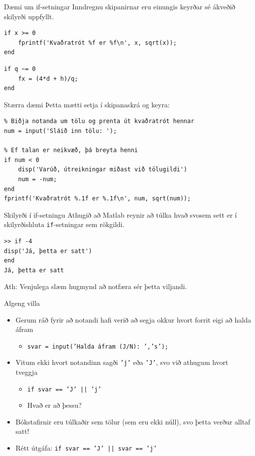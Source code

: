 \documentclass{beamer}
\begin{document}
\begin{frame}[fragile]{Dæmi um if-setningar}
Inndregnu skipanirnar eru einungis keyrðar sé ákveðið skilyrði uppfyllt.
\begin{verbatim}
if x >= 0
    fprintf('Kvaðratrót %f er %f\n', x, sqrt(x));
end
\end{verbatim}

\begin{verbatim}
if q ~= 0
    fx = (4*d + h)/q;
end
\end{verbatim}

\end{frame}

\begin{frame}[fragile]{Stærra dæmi}
Þetta mætti setja í skipanaskrá og keyra:
\begin{verbatim}
% Biðja notanda um tölu og prenta út kvaðratrót hennar
num = input('Sláið inn tölu: ');

% Ef talan er neikvæð, þá breyta henni
if num < 0
    disp('Varúð, útreikningar miðast við tölugildi')
    num = -num;
end
fprintf('Kvaðratrót %.1f er %.1f\n', num, sqrt(num));
\end{verbatim}
\end{frame}

\begin{frame}[fragile]{Skilyrði í if-setningu}
Athugið að Matlab reynir að túlka hvað svosem sett er í skilyrðishluta \texttt{if}-setningar sem rökgildi.

\begin{verbatim}
>> if -4
disp('Já, þetta er satt')
end
Já, þetta er satt
\end{verbatim}
Ath: Venjulega slæm hugmynd að notfæra sér þetta viljandi.
\end{frame}

\begin{frame}{Algeng villa}
\begin{itemize}
 \item Gerum ráð fyrir að notandi hafi verið að segja okkur hvort forrit eigi að halda áfram
 \begin{itemize}
  \item \texttt{svar = input('Halda áfram (J/N): ','s');}
 \end{itemize}
 \item Vitum ekki hvort notandinn sagði \texttt{'j'} eða \texttt{'J'}, svo við athugum hvort tveggja
 \begin{itemize}
  \item \texttt{if svar == 'J' || 'j'}
  \item Hvað er að þessu? \pause
 \end{itemize}
 \item Bókstafirnir eru túlkaðir sem tölur (sem eru ekki núll), svo þetta verður alltaf satt!
 \item Rétt útgáfa: \texttt{if svar == 'J' || svar == 'j'}
\end{itemize}
\end{frame}
\end{document}
